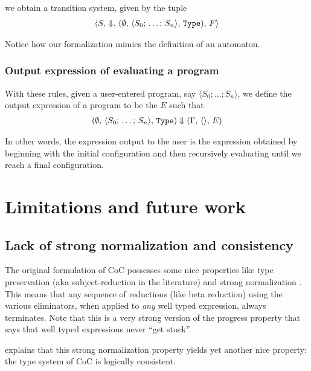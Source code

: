 \documentclass{article}
\begin{document}
we obtain a transition system, given by the tuple
\begin{align*}
  \langle S, \, \Downarrow, \, 
  (\emptyset, \, \langle S_0; \, \dots; \, S_n \rangle, \, \texttt{Type}), \, F \rangle
\end{align*}

Notice how our formalization mimics the definition of an automaton.

\subsubsection{Output expression of evaluating a program}
With these rules, given a user-entered program, say $\langle S_0;
\dots; S_n \rangle$, we define the
output expression of a program to be the $E$ such that
\begin{align*}
  (\emptyset, \, \langle S_0; \, \dots; \, S_n \rangle, \, \texttt{Type}) \Downarrow
  (\Gamma, \, \langle \rangle, \, E)
\end{align*}

In other words, the expression output to the user is the expression obtained by
beginning with the initial configuration and then recursively evaluating
until we reach a final configuration.

\section{Limitations and future work}
\subsection{Lack of strong normalization and consistency}
The original formulation of CoC possesses some nice properties like type
preservation (aka subject-reduction in the literature) and strong
normalization \cite{coc_strong_norm_kripke, coc_strong_norm_short_flexible}. 
This means that any sequence of reductions (like beta reduction) using the 
various eliminators, when applied to \textit{any} well typed expression, always terminates.
Note that this is a very strong version of the progress property that says
that well typed expressions never ``get stuck''. 

\cite{coc_strong_norm_kripke} explains that this strong normalization
property yields yet another nice property: the type system of CoC is logically
consistent.
\end{document}
